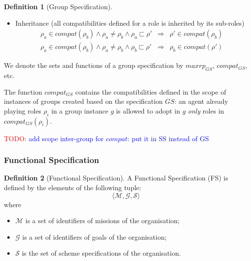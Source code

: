 \documentclass{article}
\newcommand{\todo}[1]{\textcolor{red}{TODO: }\textcolor{blue}{#1}}
\newcommand{\set}[1]{\mathcal{#1}}
\newcommand{\subrole}{\sqsubset}
\theoremstyle{definition} \newtheorem{definition}{Definition}
\begin{document}
\begin{definition}[Group Specification]
\begin{itemize}
\item Inheritance (all compatibilities defined for a role is inherited
  by its sub-roles) %
  \begin{eqnarray}
    \rho_a \in compat(\rho_b) \land \rho_a \neq \rho_b \land \rho_a \subrole \rho' &\Rightarrow&  \rho' \in compat(\rho_b)\\
    \rho_a \in compat(\rho_b) \land \rho_a \neq \rho_b \land \rho_b \subrole \rho' &\Rightarrow&  \rho_b \in compat(\rho')
  \end{eqnarray}

\end{itemize}
\end{definition}
We denote the sets and functions of a group specification by
$maxrp_{GS}$, $compat_{GS}$, etc.

The function $compat_{GS}$ contains the compatibilities defined in the
scope of instances of groups created based on the specification $GS$:
an agent already playing roles $\rho_i$ in a group instance $g$ is
allowed to adopt in $g$ \emph{only} roles in $compat_{GS}(\rho_i)$.

\todo{add scope inter-group for $compat$: put it in SS instead of GS}


\subsubsection{Functional Specification}

\begin{definition}[Functional Specification]
  A Functional Specification (FS) is defined by the
  elements of the following tuple:
  \begin{displaymath}
    \langle \set{M}, \set{G}, \set{S} \rangle
  \end{displaymath}
  where
  \begin{itemize}
 \item $\set{M}$ is a set of identifiers of missions of the organisation;
 \item $\set{G}$ is a set of identifiers of goals of the organisation;
 \item $\set{S}$ is the set of scheme specifications of the organisation.
  \end{itemize}
\end{definition}
\end{document}
